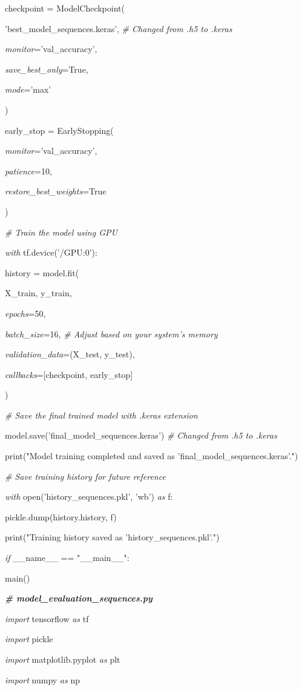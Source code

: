 \documentclass[
]{article}
\begin{document}
checkpoint = ModelCheckpoint(

'best\_model\_sequences.keras', \emph{\# Changed from .h5 to .keras}

\emph{monitor}='val\_accuracy',

\emph{save\_best\_only}=True,

\emph{mode}='max'

)

early\_stop = EarlyStopping(

\emph{monitor}='val\_accuracy',

\emph{patience}=10,

\emph{restore\_best\_weights}=True

)

\emph{\# Train the model using GPU}

\emph{with} tf.device('/GPU:0'):

history = model.fit(

X\_train, y\_train,

\emph{epochs}=50,

\emph{batch\_size}=16, \emph{\# Adjust based on your system's memory}

\emph{validation\_data}=(X\_test, y\_test),

\emph{callbacks}={[}checkpoint, early\_stop{]}

)

\emph{\# Save the final trained model with .keras extension}

model.save('final\_model\_sequences.keras') \emph{\# Changed from .h5 to .keras}

print("Model training completed and saved as 'final\_model\_sequences.keras'.")

\emph{\# Save training history for future reference}

\emph{with} open('history\_sequences.pkl', 'wb') \emph{as} f:

pickle.dump(history.history, f)

print("Training history saved as 'history\_sequences.pkl'.")

\emph{if} \_\_name\_\_ == "\_\_main\_\_":

main()

\emph{\textbf{\# model\_evaluation\_sequences.py}}

\emph{import} tensorflow \emph{as} tf

\emph{import} pickle

\emph{import} matplotlib.pyplot \emph{as} plt

\emph{import} numpy \emph{as} np
\end{document}
